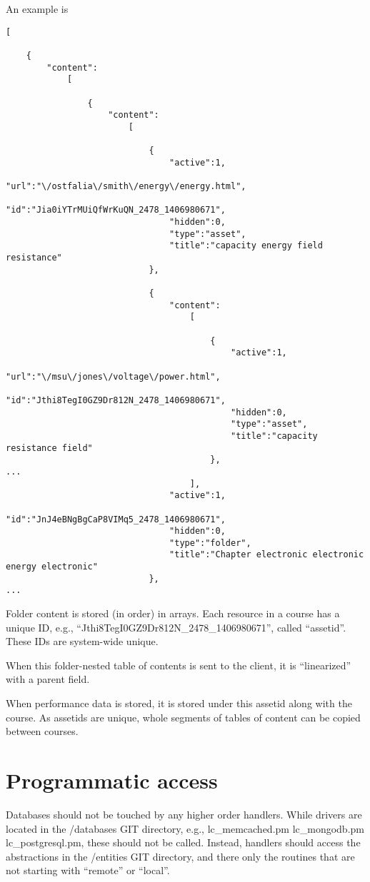An example is
\begin{verbatim}
[
    
    {
        "content":
            [
                
                {
                    "content":
                        [
                            
                            {
                                "active":1,
                                "url":"\/ostfalia\/smith\/energy\/energy.html",
                                "id":"Jia0iYTrMUiQfWrKuQN_2478_1406980671",
                                "hidden":0,
                                "type":"asset",
                                "title":"capacity energy field resistance"
                            },
                            
                            {
                                "content":
                                    [
                                        
                                        {
                                            "active":1,
                                            "url":"\/msu\/jones\/voltage\/power.html",
                                            "id":"Jthi8TegI0GZ9Dr812N_2478_1406980671",
                                            "hidden":0,
                                            "type":"asset",
                                            "title":"capacity resistance field"
                                        },
...
                                    ],
                                "active":1,
                                "id":"JnJ4eBNgBgCaP8VIMq5_2478_1406980671",
                                "hidden":0,
                                "type":"folder",
                                "title":"Chapter electronic electronic energy electronic"
                            },
...
\end{verbatim}
Folder content is stored (in order) in arrays. Each resource in a course has a unique ID, e.g., ``Jthi8TegI0GZ9Dr812N\_2478\_1406980671'', called ``assetid''.  These IDs are system-wide unique.

When this folder-nested table of contents is sent to the client, it is ``linearized'' with a parent field.

When performance data is stored, it is stored under this assetid along with the course. As assetids are unique, whole segments of tables of content can be copied between courses.


\section{Programmatic access}
Databases should not be touched by any higher order handlers. While drivers are located in the /databases GIT directory, e.g., lc\_memcached.pm  lc\_mongodb.pm  lc\_postgresql.pm, these should not be called. Instead, handlers should access the abstractions in the /entities GIT directory, and there only the routines that are not starting with ``remote'' or ``local''.
